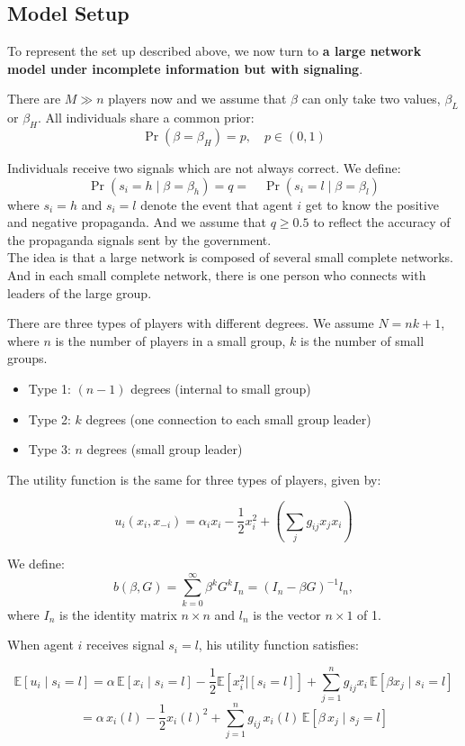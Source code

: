 \documentclass[12pt]{article}
\begin{document}
\subsection*{Model Setup}
To represent the set up described above, we now turn to \textbf{a large network model under incomplete information but with signaling}.

There are $M \gg n$ players now and we assume that $\beta$ can only take two values, $\beta_L$ or $\beta_H$.  
All individuals share a common prior:
\[
\Pr(\beta = \beta_H) = p, \quad p \in (0,1)
\]

Individuals receive two signals which are not always correct.  
We define:
\[
\Pr(s_i = h \mid \beta = \beta_h) = q = \quad \Pr(s_i = l \mid \beta = \beta_l) 
\]
where $s_i = h$ and $s_i = l$ denote the event that agent $i$ get to know the positive and negative propaganda. And we assume that $q \geq 0.5$ to reflect the accuracy of the propaganda signals sent by the government.\\

The idea is that a large network is composed of several small complete networks.  
And in each small complete network, there is one person who connects with leaders of the large group.

There are three types of players with different degrees.  
We assume $N = nk + 1$, where $n$ is the number of players in a small group, $k$ is the number of small groups.

\begin{itemize}
    \item Type 1: $(n-1)$ degrees (internal to small group)
    \item Type 2: $k$ degrees (one connection to each small group leader)
    \item Type 3: $n$ degrees (small group leader)
\end{itemize}

The utility function is the same for three types of players, given by:

\[
u_i(x_i, x_{-i}) = \alpha_i x_i - \frac{1}{2}x_i^2 + \left( \sum_j g_{ij} x_j x_i \right)
\]

We define:
\[
b(\beta, G) = \sum_{k=0}^{\infty} \beta^k G^k I_n = (I_n - \beta G)^{-1} l_n,
\]
where \( I_n \) is the identity matrix \( n \times n \) and \( l_n \) is the vector \( n \times 1 \) of 1.

When agent $i$ receives signal $s_i = l$, his utility function satisfies:


\[
\mathbb{E}[u_i \mid s_i = l] = \alpha \, \mathbb{E}[x_i \mid s_i = l]
-\frac{1}{2}\mathbb{E}[x_i^2|[s_i=l]]+ \sum_{j = 1}^n g_{ij} x_i\, \mathbb{E}[\beta x_j \mid s_i = l]
\]
\[
= \alpha \, x_i(l) - \frac{1}{2} x_i(l)^2 + \sum_{j=1}^{n} g_{ij} \, x_i(l) \, \mathbb{E}\left[ \beta \, x_j \mid s_j = l \right]
\]
\end{document}
